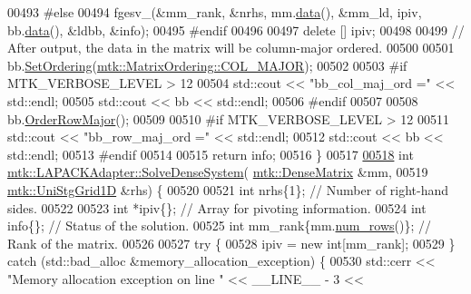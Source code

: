 \begin{DoxyCode}
00493 \textcolor{preprocessor}{  #else}
00494   fgesv\_(&mm\_rank, &nrhs, mm.\hyperlink{classmtk_1_1DenseMatrix_a0c33b8a9e01d157c61ddbdf807c25d84}{data}(), &mm\_ld, ipiv, bb.\hyperlink{classmtk_1_1DenseMatrix_a0c33b8a9e01d157c61ddbdf807c25d84}{data}(), &ldbb, &info);
00495 \textcolor{preprocessor}{  #endif}
00496 
00497   \textcolor{keyword}{delete} [] ipiv;
00498 
00499   \textcolor{comment}{// After output, the data in the matrix will be column-major ordered.}
00500 
00501   bb.\hyperlink{classmtk_1_1DenseMatrix_a178e63f365cf8c547dc5020c60357f5e}{SetOrdering}(\hyperlink{namespacemtk_ga622801bd9f912d0f976c3e383f5f581ca34d2765ffc490951febdcca04bc4f7cd}{mtk::MatrixOrdering::COL\_MAJOR});
00502 
00503 \textcolor{preprocessor}{  #if MTK\_VERBOSE\_LEVEL > 12}
00504   std::cout << \textcolor{stringliteral}{"bb\_col\_maj\_ord ="} << std::endl;
00505   std::cout << bb << std::endl;
00506 \textcolor{preprocessor}{  #endif}
00507 
00508   bb.\hyperlink{classmtk_1_1DenseMatrix_ac2949efba3e8278335d45418c85433e4}{OrderRowMajor}();
00509 
00510 \textcolor{preprocessor}{  #if MTK\_VERBOSE\_LEVEL > 12}
00511   std::cout << \textcolor{stringliteral}{"bb\_row\_maj\_ord ="} << std::endl;
00512   std::cout << bb << std::endl;
00513 \textcolor{preprocessor}{  #endif}
00514 
00515   \textcolor{keywordflow}{return} info;
00516 \}
00517 
\hypertarget{mtk__lapack__adapter_8cc_source_l00518}{}\hyperlink{classmtk_1_1LAPACKAdapter_ac38be1e30a2456b2a14c8a81f47c4ba1}{00518} \textcolor{keywordtype}{int} \hyperlink{classmtk_1_1LAPACKAdapter_a7428bccf74fd4a4af68fb7233846da22}{mtk::LAPACKAdapter::SolveDenseSystem}(
      \hyperlink{classmtk_1_1DenseMatrix}{mtk::DenseMatrix} &mm,
00519                                          \hyperlink{classmtk_1_1UniStgGrid1D}{mtk::UniStgGrid1D} &rhs) \{
00520 
00521   \textcolor{keywordtype}{int} nrhs\{1\};  \textcolor{comment}{// Number of right-hand sides.}
00522 
00523   \textcolor{keywordtype}{int} *ipiv\{\};                \textcolor{comment}{// Array for pivoting information.}
00524   \textcolor{keywordtype}{int} info\{\};                 \textcolor{comment}{// Status of the solution.}
00525   \textcolor{keywordtype}{int} mm\_rank\{mm.\hyperlink{classmtk_1_1DenseMatrix_a53f3afb3b6a8d21854458aaa9663cc74}{num\_rows}()\}; \textcolor{comment}{// Rank of the matrix.}
00526 
00527   \textcolor{keywordflow}{try} \{
00528     ipiv = \textcolor{keyword}{new} \textcolor{keywordtype}{int}[mm\_rank];
00529   \} \textcolor{keywordflow}{catch} (std::bad\_alloc &memory\_allocation\_exception) \{
00530     std::cerr << \textcolor{stringliteral}{"Memory allocation exception on line "} << \_\_LINE\_\_ - 3 <<

\end{DoxyCode}
